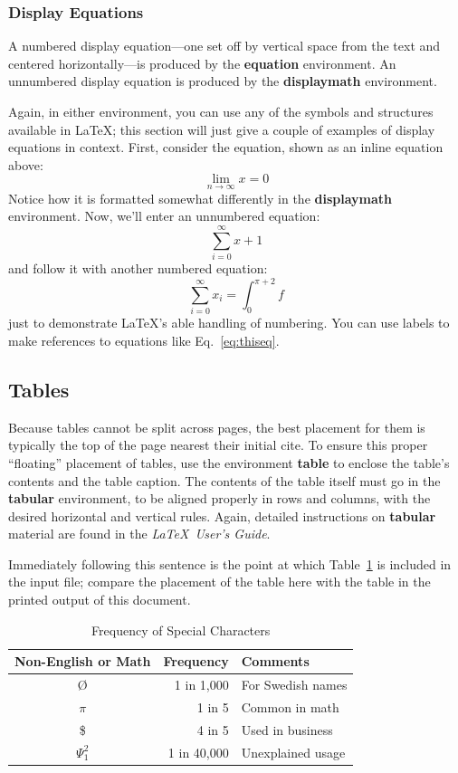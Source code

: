 \documentclass[12pt,MSc,a4paper,oneside]{muthesis}
\begin{document}
\subsubsection{Display Equations}\label{sec:display_equations}
A numbered display equation---one set off by vertical space from the
text and centered horizontally---is produced by the \textbf{equation}
environment. An unnumbered display equation is produced by the
\textbf{displaymath} environment.

Again, in either environment, you can use any of the symbols
and structures available in \LaTeX\@; this section will just
give a couple of examples of display equations in context.
First, consider the equation, shown as an inline equation above:
\begin{equation}\label{eq:thiseq}
  \lim_{n\rightarrow \infty}x=0
\end{equation}
Notice how it is formatted somewhat differently in
the \textbf{displaymath}
environment.  Now, we'll enter an unnumbered equation:
\begin{equation*}
  \sum_{i=0}^{\infty} x + 1
\end{equation*}
and follow it with another numbered equation:
\begin{equation}
  \sum_{i=0}^{\infty}x_i=\int_{0}^{\pi+2} f
\end{equation}
just to demonstrate \LaTeX's able handling of numbering. You can use labels to make references to equations like Eq.~\ref{eq:thiseq}.


\subsection{Tables}
Because tables cannot be split across pages, the best
placement for them is typically the top of the page
nearest their initial cite.  To
ensure this proper ``floating'' placement of tables, use the
environment \textbf{table} to enclose the table's contents and
the table caption.  The contents of the table itself must go
in the \textbf{tabular} environment, to
be aligned properly in rows and columns, with the desired
horizontal and vertical rules.  Again, detailed instructions
on \textbf{tabular} material
are found in the \textit{\LaTeX\ User's Guide}.

Immediately following this sentence is the point at which
Table~\ref{tab:freq} is included in the input file; compare the
placement of the table here with the table in the printed
output of this document.

\begin{table}
  \caption{Frequency of Special Characters}
  \label{tab:freq}
  \centering
  \begin{tabular}{crl}
    \toprule
    Non-English or Math&Frequency&Comments\\
    \midrule
    \O & 1 in 1,000& For Swedish names\\
    $\pi$ & 1 in 5& Common in math\\
    \$ & 4 in 5 & Used in business\\
    $\Psi^2_1$ & 1 in 40,000& Unexplained usage\\
  \bottomrule
\end{tabular}
\end{table}
\end{document}

